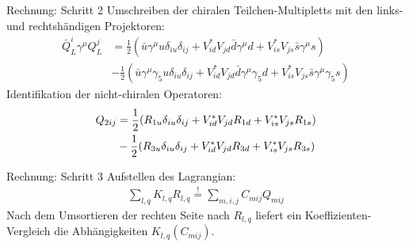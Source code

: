 \begin{frame}{Rechnung: Schritt 2}
Umschreiben der chiralen Teilchen-Multipletts mit den links- und rechtshändigen Projektoren:
\begin{align*}
	\bar{Q}_L^i\gamma^\mu Q_L^j &=\frac{1}{2}(
	\bar{u}\gamma^\mu u\delta_{iu}\delta_{ij} + V_{id}^*V_{jd}\bar{d}\gamma^\mu d
	+ V_{is}^*V_{js}\bar{s}\gamma^\mu s) \\
	&- \frac{1}{2}(\bar{u}\gamma^\mu\gamma_5u\delta_{iu}\delta_{ij} + V_{id}^*V_{jd}\bar{d}\gamma^\mu\gamma_5d + V_{is}^*V_{js}\bar{s}\gamma^\mu\gamma_5s)
\end{align*}
Identifikation der nicht-chiralen Operatoren:
\begin{align*}
	Q_{2ij} &= \frac{1}{2}(R_{1u}\delta_{iu}\delta_{ij}+ V_{id}^*V_{jd}R_{1d}+ V_{is}^*V_{js}R_{1s}) \notag \\
	&- \frac{1}{2}(R_{3u}\delta_{iu}\delta_{ij} + V_{id}^*V_{jd}R_{3d} + V_{is}^*V_{js}R_{3s})
\end{align*}
\end{frame}


\begin{frame}{Rechnung: Schritt 3}
Aufstellen des Lagrangian:
\begin{align*}
	\sum_{l,q} K_{l,q}R_{l,q} \overset{!}{=} \sum_{m,i,j}C_{mij}Q_{mij}
\end{align*}
Nach dem Umsortieren der rechten Seite nach $R_{l,q}$ liefert ein Koeffizienten-Vergleich die Abhängigkeiten $K_{l,q}(C_{mij})$.
\end{frame}